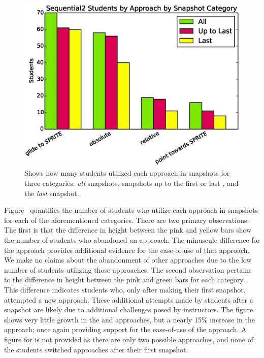 \begin{figure}[!t]
\centering \includegraphics[width=5.25in]{graphs/approach_bar_Sequential2.eps}
\caption{Shows how many students utilized each approach in \stwo{} snapshots
  for three categories: \emph{all} snapshots, snapshots up to the first \com{}
  or last \incom{}, and the \emph{last} snapshot.}
\end{figure}

Figure~ quantifies the number of students who
utilize each approach in \stwo{} snapshots for each of the aforementioned
categories. There are two primary observations: The first is that the
difference in height between the pink and yellow bars show the number of
students who abandoned an approach. The minuscule difference for the \glideto{}
approach provides additional evidence for the ease-of-use of that approach. We
make no claims about the abandonment of other approaches due to the low number
of students utilizing those approaches. The second observation pertains to the
difference in height between the pink and green bars for each category. This
difference indicates students who, only after making their first \com{}
snapshot, attempted a new approach. These additional attempts made by students
after a \com{} snapshot are likely due to additional challenges posed by
instructors. The figure shows very little growth in the \abs{} and \rel{}
approaches, but a nearly 15\% increase in the \glideto{} approach; once again
providing support for the ease-of-use of the \glideto{} approach. A figure for
\sone{} is not provided as there are only two possible approaches, and none of
the students switched approaches after their first \com{} snapshot.

